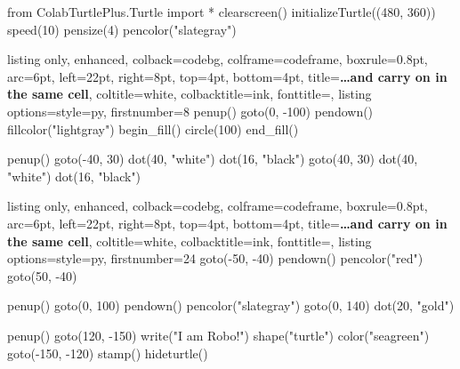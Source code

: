 \begin{typethis}
from ColabTurtlePlus.Turtle import *
clearscreen()
initializeTurtle((480, 360))
speed(10)
pensize(4)
pencolor("slategray")
\end{typethis}
\begin{tcbraster}[raster columns=2, raster column skip=10pt, raster valign=top]
\begin{tcblisting}{listing only, enhanced, colback=codebg, colframe=codeframe, boxrule=0.8pt, arc=6pt, left=22pt, right=8pt, top=4pt, bottom=4pt, title={\textbf{\ldots and carry on in the same cell}}, coltitle=white, colbacktitle=ink, fonttitle=\small, listing options={style=py, firstnumber=8}}
penup()
goto(0, -100)
pendown()
fillcolor("lightgray")
begin_fill()
circle(100)
end_fill()

penup()
goto(-40, 30)
dot(40, "white")
dot(16, "black")
goto(40, 30)
dot(40, "white")
dot(16, "black")
\end{tcblisting}
\begin{tcblisting}{listing only, enhanced, colback=codebg, colframe=codeframe, boxrule=0.8pt, arc=6pt, left=22pt, right=8pt, top=4pt, bottom=4pt, title={\textbf{\ldots and carry on in the same cell}}, coltitle=white, colbacktitle=ink, fonttitle=\small, listing options={style=py, firstnumber=24}}
goto(-50, -40)
pendown()
pencolor("red")
goto(50, -40)

penup()
goto(0, 100)
pendown()
pencolor("slategray")
goto(0, 140)
dot(20, "gold")

penup()
goto(120, -150)
write("I am Robo!")
shape("turtle")
color("seagreen")
goto(-150, -120)
stamp()
hideturtle()
\end{tcblisting}
\end{tcbraster}



